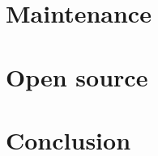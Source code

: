 \documentclass{style/CRPITStyle}
\renewcommand{\cite}{\citep}
\begin{document}
\vspace{.1in}

\section{Maintenance}

\section{Open source}

\cite{raymond:1999}

\section{Conclusion}



\end{document}
